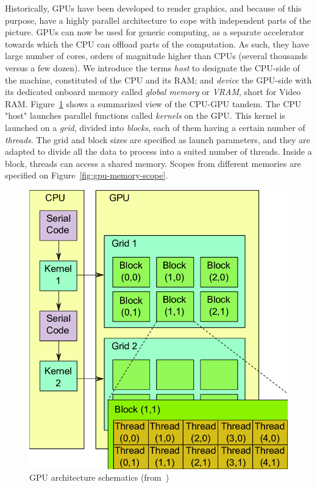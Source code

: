 Historically, GPUs have been developed to render graphics, and because of this purpose, have a highly parallel architecture to cope with independent parts of the picture. GPUs can now be used for generic computing, as a separate accelerator towards which the CPU can offload parts of the computation. As such, they have large number of cores, orders of magnitude higher than CPUs (several thousands versus a few dozen). We introduce the terms \emph{host} to designate the CPU-side of the machine, constituted of the CPU and its RAM; and \emph{device} the GPU-side with its dedicated onboard memory called \emph{global memory} or \emph{VRAM}, short for Video RAM. Figure~\ref{fig:gpu-arch} shows a summarized view of the CPU-GPU tandem. The CPU "host" launches  parallel functions called \emph{kernels} on the GPU. This kernel is launched on a \emph{grid}, divided into \emph{blocks}, each of them having a certain number of \emph{threads}. The grid and block sizes are specified as launch parameters, and they are adapted to divide all the data to process into a suited number of threads. Inside a block, threads can access a shared memory. Scopes from different memories are specified on Figure~\ref{fig:gpu-memory-scope}.

\begin{figure}[h]
	\centering
	\includegraphics[width=0.6\linewidth]{gpu-arch}
	\caption{GPU architecture schematics (from~\cite{Bartezzaghi:gpu-arch})}
	\label{fig:gpu-arch}
\end{figure}


